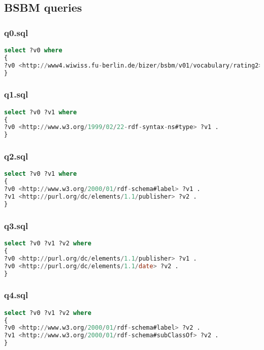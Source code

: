 \documentclass[titlepage, a4paper, 12pt] {article}
\begin{document}
\clearpage

\subsection{BSBM queries}\label{bsbm}

\subsubsection{q0.sql}

\begin{lstlisting}[language=SQL] 
select ?v0 where
{
?v0 <http://www4.wiwiss.fu-berlin.de/bizer/bsbm/v01/vocabulary/rating2> "6"^^<http://www.w3.org/2001/XMLSchema#integer> .
}
\end{lstlisting}

\subsubsection{q1.sql}

\begin{lstlisting}[language=SQL] 
select ?v0 ?v1 where
{
?v0 <http://www.w3.org/1999/02/22-rdf-syntax-ns#type> ?v1 .
}
\end{lstlisting}

\subsubsection{q2.sql}

\begin{lstlisting}[language=SQL] 
select ?v0 ?v1 where
{
?v0 <http://www.w3.org/2000/01/rdf-schema#label> ?v1 .
?v1 <http://purl.org/dc/elements/1.1/publisher> ?v2 .
}
\end{lstlisting}

\subsubsection{q3.sql}

\begin{lstlisting}[language=SQL] 
select ?v0 ?v1 ?v2 where
{
?v0 <http://purl.org/dc/elements/1.1/publisher> ?v1 .
?v0 <http://purl.org/dc/elements/1.1/date> ?v2 .
}
\end{lstlisting}

\subsubsection{q4.sql}

\begin{lstlisting}[language=SQL] 
select ?v0 ?v1 ?v2 where
{
?v0 <http://www.w3.org/2000/01/rdf-schema#label> ?v2 .
?v1 <http://www.w3.org/2000/01/rdf-schema#subClassOf> ?v2 .
}
\end{lstlisting}
\end{document}
